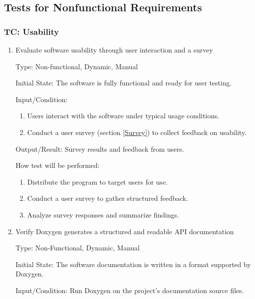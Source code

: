\documentclass[12pt, titlepage]{article}
\begin{document}
\begin{enumerate}
\end{enumerate}

\subsection{Tests for Nonfunctional Requirements}

 \label{TC_USABILITY}
\subsubsection{TC\thetestcasenum : Usability}

\begin{enumerate}

  \item{Evaluate software usability through user interaction and a survey \\}

  Type: Non-functional, Dynamic, Manual

  Initial State: The software is fully functional and ready for user testing.

  Input/Condition:
  \begin{enumerate}
    \item Users interact with the software under typical usage conditions.
    \item Conduct a user survey (section \ref{Survey}) to collect feedback on
    usability.
  \end{enumerate}

  Output/Result: Survey results and feedback from users.

  How test will be performed:
  \begin{enumerate}
    \item Distribute the program to target users for use.
    \item Conduct a user survey to gather structured feedback.
    \item Analyze survey responses and summarize findings.
  \end{enumerate}

  \item{Verify Doxygen generates a structured and readable API documentation \\}

  Type: Non-Functional, Dynamic, Manual

  Initial State: The software documentation is written in a format supported by
  Doxygen.

  Input/Condition: Run Doxygen on the project’s documentation source files.


\end{enumerate}
\end{document}
